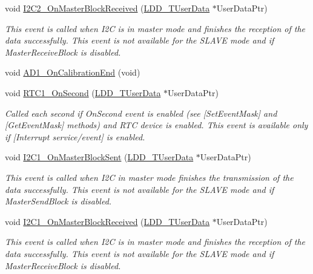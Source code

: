 \begin{DoxyCompactItemize}
void \hyperlink{group___events__module_ga5b2fe0871600de8d73184570a42e5b66}{I2\+C2\+\_\+\+On\+Master\+Block\+Received} (\hyperlink{group___p_e___types__module_ga0b66a73f87238a782318aa0be7578e35}{L\+D\+D\+\_\+\+T\+User\+Data} $\ast$User\+Data\+Ptr)
\begin{DoxyCompactList}\small\item\em This event is called when I2C is in master mode and finishes the reception of the data successfully. This event is not available for the S\+L\+A\+VE mode and if Master\+Receive\+Block is disabled. \end{DoxyCompactList}\item 
void \hyperlink{group___events__module_ga8be719cad9ac48a9cdfd2281de15ec59}{A\+D1\+\_\+\+On\+Calibration\+End} (void)
\item 
void \hyperlink{group___events__module_ga2f94110e651cb30cba928647e91e92d4}{R\+T\+C1\+\_\+\+On\+Second} (\hyperlink{group___p_e___types__module_ga0b66a73f87238a782318aa0be7578e35}{L\+D\+D\+\_\+\+T\+User\+Data} $\ast$User\+Data\+Ptr)
\begin{DoxyCompactList}\small\item\em Called each second if On\+Second event is enabled (see \mbox{[}Set\+Event\+Mask\mbox{]} and \mbox{[}Get\+Event\+Mask\mbox{]} methods) and R\+TC device is enabled. This event is available only if \mbox{[}Interrupt service/event\mbox{]} is enabled. \end{DoxyCompactList}\item 
void \hyperlink{group___events__module_gad394d39c6e6d080b1ae8cd26178003f2}{I2\+C1\+\_\+\+On\+Master\+Block\+Sent} (\hyperlink{group___p_e___types__module_ga0b66a73f87238a782318aa0be7578e35}{L\+D\+D\+\_\+\+T\+User\+Data} $\ast$User\+Data\+Ptr)
\begin{DoxyCompactList}\small\item\em This event is called when I2C in master mode finishes the transmission of the data successfully. This event is not available for the S\+L\+A\+VE mode and if Master\+Send\+Block is disabled. \end{DoxyCompactList}\item 
void \hyperlink{group___events__module_gad0eaee8bf9e6df0596ba2542bb3e1c32}{I2\+C1\+\_\+\+On\+Master\+Block\+Received} (\hyperlink{group___p_e___types__module_ga0b66a73f87238a782318aa0be7578e35}{L\+D\+D\+\_\+\+T\+User\+Data} $\ast$User\+Data\+Ptr)
\begin{DoxyCompactList}\small\item\em This event is called when I2C is in master mode and finishes the reception of the data successfully. This event is not available for the S\+L\+A\+VE mode and if Master\+Receive\+Block is disabled. \end{DoxyCompactList}\end{DoxyCompactItemize}


